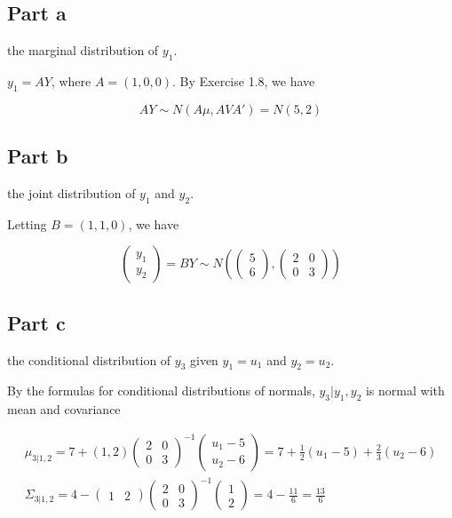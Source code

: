 \documentclass{article}
\begin{document}
\subsection*{Part a}

the marginal distribution of $y_1$.

$y_1 = AY$, where $A=(1, 0, 0)$. By Exercise 1.8, we have

\[
AY \sim N(A\mu, AVA') = N(5, 2)
\]

\subsection*{Part b}

the joint distribution of $y_1$ and $y_2$.

Letting $B=(1, 1, 0)$, we have

\[
\begin{pmatrix}
y_1 \\ y_2
\end{pmatrix}
= BY \sim N\left(
\begin{pmatrix}
5 \\ 6
\end{pmatrix},
\begin{pmatrix}
2 & 0\\
0 & 3
\end{pmatrix}
\right)
\]

\subsection*{Part c}

the conditional distribution of $y_3$ given $y_1=u_1$ and $y_2=u_2$.

By the formulas for conditional distributions of normals, $y_3|y_1, y_2$ is normal with mean and covariance

\begin{gather*}
\mu_{3|1, 2} = 7 + (1, 2)\begin{pmatrix}
2 & 0 \\
0 & 3
\end{pmatrix}^{-1}
\begin{pmatrix}
u_1-5 \\ u_2-6
\end{pmatrix}
= 7 + \frac{1}{2}(u_1-5) + \frac{2}{3}(u_2-6) \\
\Sigma_{3|1,2} = 4-
\begin{pmatrix}
1 & 2
\end{pmatrix}
\begin{pmatrix}
2 & 0\\
0 & 3
\end{pmatrix}^{-1}
\begin{pmatrix}
1 \\ 2
\end{pmatrix} = 4-\frac{11}{6} = \frac{13}{6}
\end{gather*}
\end{document}
